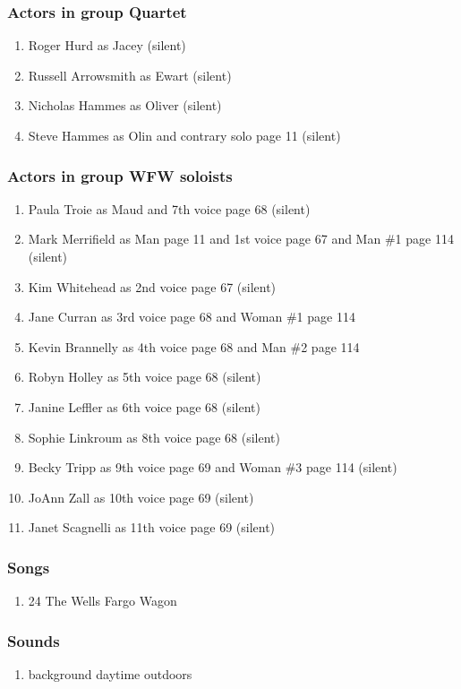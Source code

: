 \subsubsection{Actors in group Quartet}
\begin{enumerate}
\item Roger Hurd as Jacey (silent)
\item Russell Arrowsmith as Ewart (silent)
\item Nicholas Hammes as Oliver (silent)
\item Steve Hammes as Olin and contrary solo page 11 (silent)
\end{enumerate}
\subsubsection{Actors in group WFW soloists}
\begin{enumerate}
\item Paula Troie as Maud and 7th voice page 68 (silent)
\item Mark Merrifield as Man page 11 and 1st voice page 67 and Man \#1 page 114 (silent)
\item Kim Whitehead as 2nd voice page 67 (silent)
\item Jane Curran as 3rd voice page 68 and Woman \#1 page 114
\item Kevin Brannelly as 4th voice page 68 and Man \#2 page 114
\item Robyn Holley as 5th voice page 68 (silent)
\item Janine Leffler as 6th voice page 68 (silent)
\item Sophie Linkroum as 8th voice page 68 (silent)
\item Becky Tripp as 9th voice page 69 and Woman \#3 page 114 (silent)
\item JoAnn Zall as 10th voice page 69 (silent)
\item Janet Scagnelli as 11th voice page 69 (silent)
\end{enumerate}

\subsubsection{Songs}
\begin{enumerate}
\item 24 The Wells Fargo Wagon
\end{enumerate}\subsubsection{Sounds}
\begin{enumerate}
\item background daytime outdoors
\end{enumerate}
